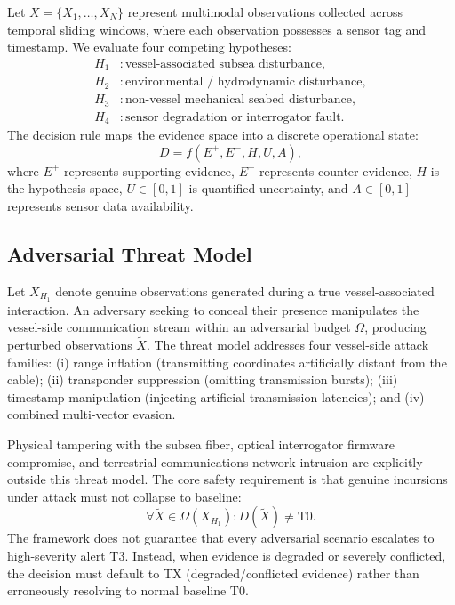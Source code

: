 \documentclass[conference]{IEEEtran}
\newcommand{\dstate}[1]{\ensuremath{\mathrm{#1}}}
\begin{document}
Let $X = \{X_1, \ldots, X_N\}$ represent multimodal observations collected across temporal sliding windows, where each observation possesses a sensor tag and timestamp. We evaluate four competing hypotheses:
\begin{align}
H_1&: \text{vessel-associated subsea disturbance}, \\
H_2&: \text{environmental / hydrodynamic disturbance}, \\
H_3&: \text{non-vessel mechanical seabed disturbance}, \\
H_4&: \text{sensor degradation or interrogator fault}.
\end{align}
The decision rule maps the evidence space into a discrete operational state:
\begin{equation}
D = f(E^{+}, E^{-}, H, U, A),
\end{equation}
where $E^{+}$ represents supporting evidence, $E^{-}$ represents counter-evidence, $H$ is the hypothesis space, $U \in [0, 1]$ is quantified uncertainty, and $A \in [0, 1]$ represents sensor data availability.

\subsection{Adversarial Threat Model}
Let $X_{H_1}$ denote genuine observations generated during a true vessel-associated interaction. An adversary seeking to conceal their presence manipulates the vessel-side communication stream within an adversarial budget $\Omega$, producing perturbed observations $\tilde{X}$. The threat model addresses four vessel-side attack families:
(i) range inflation (transmitting coordinates artificially distant from the cable);
(ii) transponder suppression (omitting transmission bursts);
(iii) timestamp manipulation (injecting artificial transmission latencies); and
(iv) combined multi-vector evasion.

Physical tampering with the subsea fiber, optical interrogator firmware compromise, and terrestrial communications network intrusion are explicitly outside this threat model. The core safety requirement is that genuine incursions under attack must not collapse to baseline:
\begin{equation}
\forall \tilde{X} \in \Omega(X_{H_1}): D(\tilde{X}) \neq \dstate{T0}.
\label{eq:safety}
\end{equation}
The framework does not guarantee that every adversarial scenario escalates to high-severity alert \dstate{T3}. Instead, when evidence is degraded or severely conflicted, the decision must default to \dstate{TX} (degraded/conflicted evidence) rather than erroneously resolving to normal baseline \dstate{T0}.
\end{document}
